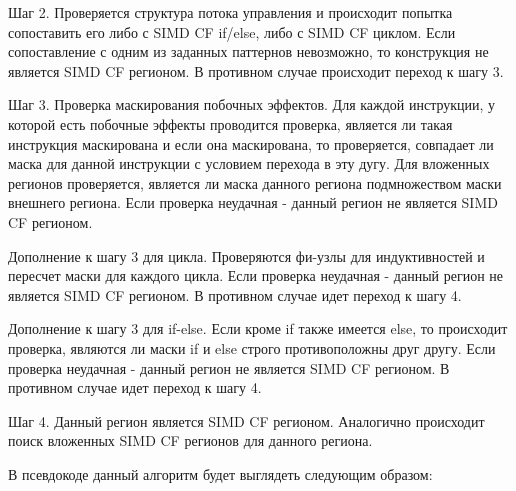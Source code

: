 Шаг 2. Проверяется структура потока управления и происходит попытка сопоставить
его либо с SIMD CF if/else, либо с SIMD CF циклом. Если сопоставление с одним из
заданных паттернов невозможно, то конструкция не является SIMD CF регионом. В
противном случае происходит переход к шагу 3.

Шаг 3. Проверка маскирования побочных эффектов. Для каждой инструкции, у которой
есть побочные эффекты проводится проверка, является ли такая инструкция
маскирована и если она маскирована, то проверяется, совпадает ли маска для
данной инструкции с условием перехода в эту дугу. Для вложенных регионов
проверяется, является ли маска данного региона подмножеством маски внешнего
региона. Если проверка неудачная - данный регион не является SIMD CF регионом.

Дополнение к шагу 3 для цикла. Проверяются фи-узлы для индуктивностей и пересчет
маски для каждого цикла. Если проверка неудачная - данный регион не является
SIMD CF регионом. В противном случае идет переход к шагу 4.

Дополнение к шагу 3 для if-else. Если кроме if также имеется else, то происходит
проверка, являются ли маски if и else строго противоположны друг другу. Если
проверка неудачная - данный регион не является SIMD CF регионом. В противном
случае идет переход к шагу 4.

Шаг 4. Данный регион является SIMD CF регионом. Аналогично происходит поиск
вложенных SIMD CF регионов для данного региона.

В псевдокоде данный алгоритм будет выглядеть следующим образом:

